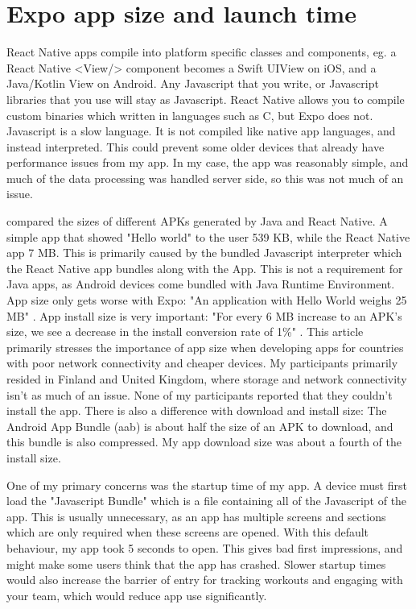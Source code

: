 \documentclass{l4proj}
\begin{document}
\section{Expo app size and launch time}
React Native apps compile into platform specific classes and components, eg. a React Native <View/> component becomes a Swift UIView on iOS, and a Java/Kotlin View on Android. Any Javascript that you write, or Javascript libraries that you use will stay as Javascript. React Native allows you to compile custom binaries which written in languages such as C, but Expo does not. Javascript is a slow language. It is not compiled like native app languages, and instead interpreted. This could prevent some older devices that already have performance issues from my app. In my case, the app was reasonably simple, and much of the data processing was handled server side, so this was not much of an issue. 

\citet{app_size} compared the sizes of different APKs generated by Java and React Native. A simple app that showed "Hello world" to the user 539 KB, while the React Native app 7 MB. This is primarily caused by the bundled Javascript interpreter which the React Native app bundles along with the App. This is not a requirement for Java apps, as Android devices come bundled with Java Runtime Environment. App size only gets worse with Expo: "An application with Hello World weighs 25 MB" \citep{expo}. App install size is very important: "For every 6 MB increase to an APK’s size, we see a decrease in the install conversion rate of 1\%" \citep{app_conversions}. This article primarily stresses the importance of app size when developing apps for countries with poor network connectivity and cheaper devices. My participants primarily resided in Finland and United Kingdom, where storage and network connectivity isn't as much of an issue. None of my participants reported that they couldn't install the app. There is also a difference with download and install size: The Android App Bundle (aab) is about half the size of an APK to download, and this bundle is also compressed. My app download size was about a fourth of the install size.

One of my primary concerns was the startup time of my app. A device must first load the "Javascript Bundle" which is a file containing all of the Javascript of the app. This is usually unnecessary, as an app has multiple screens and sections which are only required when these screens are opened. With this default behaviour, my app took 5 seconds to open. This gives bad first impressions, and might make some users think that the app has crashed. Slower startup times would also increase the barrier of entry for tracking workouts and engaging with your team, which would reduce app use significantly.
\end{document}
